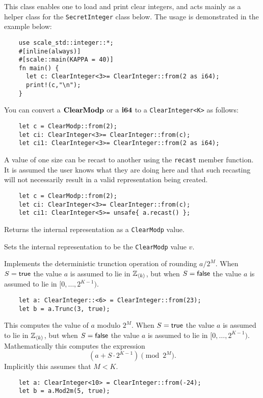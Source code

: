 This class enables one to load and print clear integers, and acts
mainly as a helper class for the \verb|SecretInteger| class below.
The usage is demonstrated in the example below:
\begin{lstlisting}
    use scale_std::integer::*;
    #[inline(always)]
    #[scale::main(KAPPA = 40)]
    fn main() {
      let c: ClearInteger<3>= ClearInteger::from(2 as i64);
      print!(c,"\n");
    }
\end{lstlisting}

You can convert a $\mathbf{ClearModp}$ or a $\mathbf{i64}$ to a \verb|ClearInteger<K>| as follows:
\begin{lstlisting}
    let c = ClearModp::from(2);
    let ci: ClearInteger<3>= ClearInteger::from(c);
    let ci1: ClearInteger<3>= ClearInteger::from(2 as i64);
\end{lstlisting}

A value of one size can be recast to another using the \verb|recast|
member function. It is assumed the user knows what they are doing here
and that such recasting will not necessarily result in a valid representation
being created.
\begin{lstlisting}
    let c = ClearModp::from(2);
    let ci: ClearInteger<3>= ClearInteger::from(c);
    let ci1: ClearInteger<5>= unsafe{ a.recast() };
\end{lstlisting}

Returns the internal representation as a \verb|ClearModp| value.

Sets the internal representation to be the \verb|ClearModp| value $v$.

Implements the deterministic trunction operation of rounding $a/2^M$.
When $S={\mathsf{true}}$ the value $a$ is assumed to lie in ${\mathbb{Z}}_{\langle k \rangle}$,
but when $S={\mathsf{false}}$ the value $a$ is assumed to lie in $[0,\ldots,2^{K-1})$.
\begin{lstlisting}
    let a: ClearInteger::<6> = ClearInteger::from(23);
    let b = a.Trunc(3, true);
\end{lstlisting}

This computes the value of $a$ modulo $2^M$.
When $S={\mathsf{true}}$ the value $a$ is assumed to lie in ${\mathbb{Z}}_{\langle k \rangle}$,
but when $S={\mathsf{false}}$ the value $a$ is assumed to lie in $[0,\ldots,2^{K-1})$.
Mathematically this computes the expression
\[  \left( a + S \cdot 2^{K-1} \right) \pmod 2^M. \]
Implicitly this assumes that $M < K$.
\begin{lstlisting}
    let a: ClearInteger<10> = ClearInteger::from(-24);
    let b = a.Mod2m(5, true);
\end{lstlisting}

